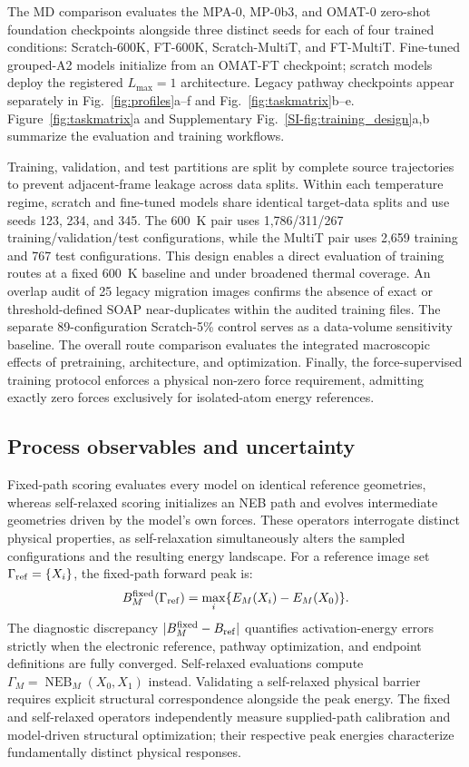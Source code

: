 \documentclass[pdflatex,sn-mathphys-num]{sn-jnl}
\newif\ifreviewcopy
\newcommand{\rev}[2]{\ifreviewcopy{\color{revisionblue}#2\textsuperscript{\scriptsize[R1-#1]}}\else#2\fi}
\newcommand{\sifig}[1]{Supplementary Fig.~\ref{SI-#1}}
\begin{document}
The MD comparison evaluates the MPA-0, MP-0b3, and OMAT-0 zero-shot foundation checkpoints alongside three distinct seeds for each of four trained conditions: Scratch-600K, FT-600K, Scratch-MultiT, and FT-MultiT. Fine-tuned grouped-A2 models initialize from an OMAT-FT checkpoint; scratch models deploy the registered $L_{\max}=1$ architecture. Legacy pathway checkpoints appear separately in Fig.~\ref{fig:profiles}a--f and Fig.~\ref{fig:taskmatrix}b--e. Figure~\ref{fig:taskmatrix}a and \sifig{fig:training_design}a,b summarize the evaluation and training workflows.

\rev{C10}{Training, validation, and test partitions are split by complete source trajectories to prevent adjacent-frame leakage across data splits.} Within each temperature regime, scratch and fine-tuned models share identical target-data splits and use seeds 123, 234, and 345. The 600~K pair uses 1,786/311/267 training/validation/test configurations, while the MultiT pair uses 2,659 training and 767 test configurations. This design enables a direct evaluation of training routes at a fixed 600~K baseline and under broadened thermal coverage. \rev{A2}{An overlap audit of 25 legacy migration images confirms the absence of exact or threshold-defined SOAP near-duplicates within the audited training files.} \rev{A5}{The separate 89-configuration Scratch-5\% control serves as a data-volume sensitivity baseline.} The overall route comparison evaluates the integrated macroscopic effects of pretraining, architecture, and optimization. \rev{C8}{Finally, the force-supervised training protocol enforces a physical non-zero force requirement, admitting exactly zero forces exclusively for isolated-atom energy references.}

\subsection{Process observables and uncertainty}\label{sec:operators}
Fixed-path scoring evaluates every model on identical reference geometries, whereas self-relaxed scoring initializes an NEB path and evolves intermediate geometries driven by the model's own forces. These operators interrogate distinct physical properties, as self-relaxation simultaneously alters the sampled configurations and the resulting energy landscape. For a reference image set $\Gamma_{\rm ref}=\{X_i\}$, the fixed-path forward peak is:
\begin{equation}
B_M^{\rm fixed}(\Gamma_{\rm ref})=\max_i\{E_M(X_i)-E_M(X_0)\}.
\end{equation}
The diagnostic discrepancy $|B_M^{\rm fixed}-B_{\rm ref}|$ quantifies activation-energy errors strictly when the electronic reference, pathway optimization, and endpoint definitions are fully converged. Self-relaxed evaluations compute $\Gamma_M=\operatorname{NEB}_M(X_0,X_1)$ instead. Validating a self-relaxed physical barrier requires explicit structural correspondence alongside the peak energy. \rev{A1}{The fixed and self-relaxed operators independently measure supplied-path calibration and model-driven structural optimization; their respective peak energies characterize fundamentally distinct physical responses.}
\end{document}

